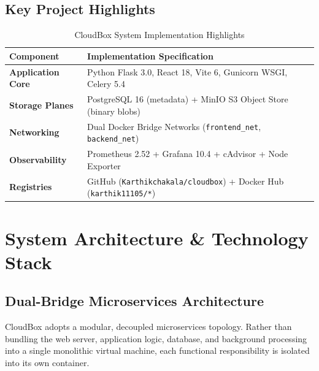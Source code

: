 \documentclass[11pt,a4paper]{report}
\begin{document}
\section{Key Project Highlights}
\begin{table}[h!]
    \centering
    \small
    \begin{tabularx}{\textwidth}{lX}
        \toprule
        \textbf{Component} & \textbf{Implementation Specification} \\
        \midrule
        \textbf{Application Core} & Python Flask 3.0, React 18, Vite 6, Gunicorn WSGI, Celery 5.4 \\
        \textbf{Storage Planes} & PostgreSQL 16 (metadata) + MinIO S3 Object Store (binary blobs) \\
        \textbf{Networking} & Dual Docker Bridge Networks (\texttt{frontend\_net}, \texttt{backend\_net}) \\
        \textbf{Observability} & Prometheus 2.52 + Grafana 10.4 + cAdvisor + Node Exporter \\
        \textbf{Registries} & GitHub (\texttt{Karthikchakala/cloudbox}) + Docker Hub (\texttt{karthik11105/*}) \\
        \bottomrule
    \end{tabularx}
    \caption{CloudBox System Implementation Highlights}
\end{table}

\clearpage

\chapter{System Architecture \& Technology Stack}

\section{Dual-Bridge Microservices Architecture}
CloudBox adopts a modular, decoupled microservices topology. Rather than bundling the web server, application logic, database, and background processing into a single monolithic virtual machine, each functional responsibility is isolated into its own container.
\end{document}
